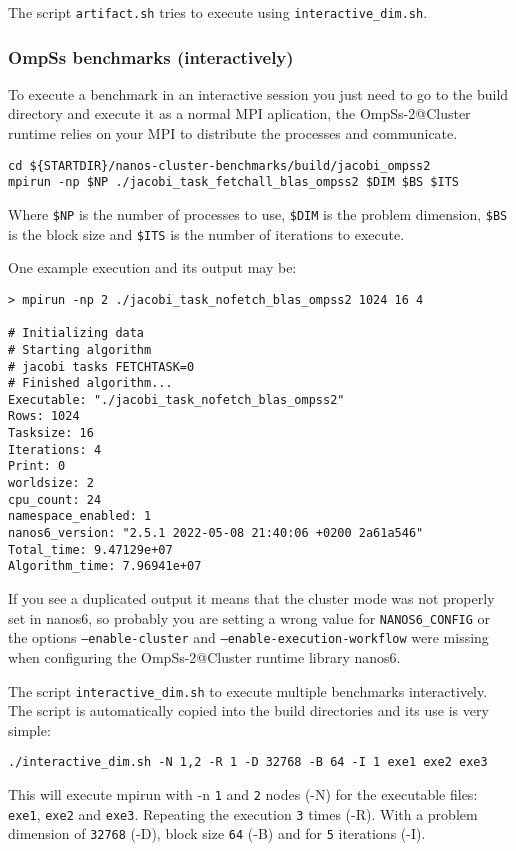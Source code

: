 \documentclass{article}
\newcommand{\code}[1]{\texttt{#1}}
\begin{document}
The script \code{artifact.sh} tries to execute using
\code{interactive\_dim.sh}.

\subsubsection{OmpSs benchmarks (interactively)}\label{INTERACTIVE}
To execute a benchmark in an interactive session you just need to go
to the build directory and execute it as a normal MPI aplication, the
OmpSs-2@Cluster runtime relies on your MPI to distribute the processes
and communicate.

\begin{lstlisting}
cd ${STARTDIR}/nanos-cluster-benchmarks/build/jacobi_ompss2
mpirun -np $NP ./jacobi_task_fetchall_blas_ompss2 $DIM $BS $ITS
\end{lstlisting}

Where \code{\$NP} is the number of processes to use, \code{\$DIM} is the
problem dimension, \code{\$BS} is the block size and \code{\$ITS} is the
number of iterations to execute.

One example execution and its output may be:
\begin{lstlisting}
> mpirun -np 2 ./jacobi_task_nofetch_blas_ompss2 1024 16 4

# Initializing data
# Starting algorithm
# jacobi tasks FETCHTASK=0
# Finished algorithm...
Executable: "./jacobi_task_nofetch_blas_ompss2"
Rows: 1024
Tasksize: 16
Iterations: 4
Print: 0
worldsize: 2
cpu_count: 24
namespace_enabled: 1
nanos6_version: "2.5.1 2022-05-08 21:40:06 +0200 2a61a546"
Total_time: 9.47129e+07
Algorithm_time: 7.96941e+07
\end{lstlisting}

If you see a duplicated output it means that the cluster mode was not
properly set in nanos6, so probably you are setting a wrong value for
\code{NANOS6\_CONFIG} or the options \code{--enable-cluster} and
\code{--enable-execution-workflow} were missing when configuring the
OmpSs-2@Cluster runtime library nanos6.

The script \code{interactive\_dim.sh} to execute multiple benchmarks
interactively. The script is automatically copied into the build
directories and its use is very simple:

\begin{lstlisting}
./interactive_dim.sh -N 1,2 -R 1 -D 32768 -B 64 -I 1 exe1 exe2 exe3
\end{lstlisting}

This will execute mpirun with -n \code{1} and \code{2} nodes (-N) for
the executable files: \code{exe1}, \code{exe2} and
\code{exe3}. Repeating the execution \code{3} times (-R). With a
problem dimension of \code{32768} (-D), block size \code{64} (-B) and
for \code{5} iterations (-I).
\end{document}
